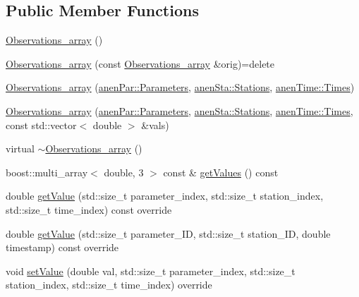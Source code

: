 \subsection*{Public Member Functions}
\begin{DoxyCompactItemize}
\item 
\mbox{\hyperlink{class_observations__array_ad161de2b3dd6537a040c2dbda002ccaf}{Observations\+\_\+array}} ()
\item 
\mbox{\hyperlink{class_observations__array_aa448781dd6c9c75fd3fa8ebf0e41e86d}{Observations\+\_\+array}} (const \mbox{\hyperlink{class_observations__array}{Observations\+\_\+array}} \&orig)=delete
\item 
\mbox{\hyperlink{class_observations__array_afff89d6d2bb295ae83c2dc02d2529ea3}{Observations\+\_\+array}} (\mbox{\hyperlink{classanen_par_1_1_parameters}{anen\+Par\+::\+Parameters}}, \mbox{\hyperlink{classanen_sta_1_1_stations}{anen\+Sta\+::\+Stations}}, \mbox{\hyperlink{classanen_time_1_1_times}{anen\+Time\+::\+Times}})
\item 
\mbox{\hyperlink{class_observations__array_a637c1332dca79ca5141ea513e86e1eb8}{Observations\+\_\+array}} (\mbox{\hyperlink{classanen_par_1_1_parameters}{anen\+Par\+::\+Parameters}}, \mbox{\hyperlink{classanen_sta_1_1_stations}{anen\+Sta\+::\+Stations}}, \mbox{\hyperlink{classanen_time_1_1_times}{anen\+Time\+::\+Times}}, const std\+::vector$<$ double $>$ \&vals)
\item 
virtual \mbox{\hyperlink{class_observations__array_a3124448be571f561a2bd2e8b44c95a2e}{$\sim$\+Observations\+\_\+array}} ()
\item 
boost\+::multi\+\_\+array$<$ double, 3 $>$ const  \& \mbox{\hyperlink{class_observations__array_a68d81504c3672e1c34a8d8da3eee389b}{get\+Values}} () const
\item 
double \mbox{\hyperlink{class_observations__array_a1d818317a4c3a6624021a6e44396ddc1}{get\+Value}} (std\+::size\+\_\+t parameter\+\_\+index, std\+::size\+\_\+t station\+\_\+index, std\+::size\+\_\+t time\+\_\+index) const override
\item 
double \mbox{\hyperlink{class_observations__array_a33f2154b3fed9d488e06e8c92eecc4db}{get\+Value}} (std\+::size\+\_\+t parameter\+\_\+\+ID, std\+::size\+\_\+t station\+\_\+\+ID, double timestamp) const override
\item 
void \mbox{\hyperlink{class_observations__array_aa6b6e042f8db0afad3beaff248b4a602}{set\+Value}} (double val, std\+::size\+\_\+t parameter\+\_\+index, std\+::size\+\_\+t station\+\_\+index, std\+::size\+\_\+t time\+\_\+index) override

\end{DoxyCompactItemize}
